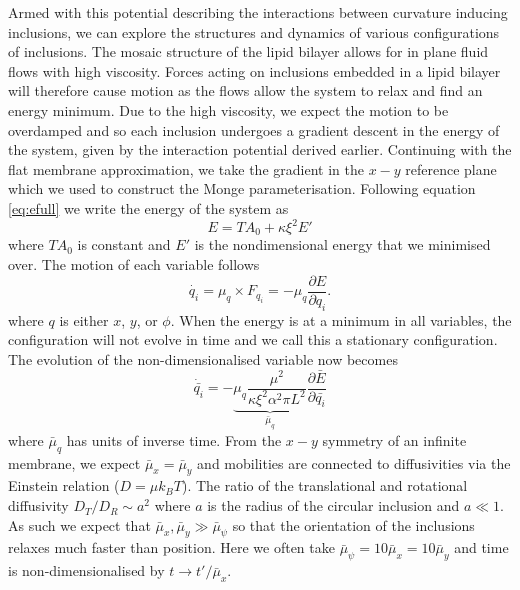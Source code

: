 Armed with this potential describing the interactions between curvature inducing inclusions, we can explore the structures and dynamics of various configurations of inclusions. The mosaic structure of the lipid bilayer allows for in plane fluid flows with high viscosity. Forces acting on inclusions embedded in a lipid bilayer will therefore cause motion as the flows allow the system to relax and find an energy minimum. Due to the high viscosity, we expect the motion to be overdamped and so each inclusion undergoes a gradient descent in the energy of the system, given by the interaction potential derived earlier. Continuing with the flat membrane approximation, we take the gradient in the $x-y$ reference plane which we used to construct the Monge parameterisation. Following equation \ref{eq:efull} we write the energy of the system as
\begin{equation}
        E= TA_0 + \kappa\xi^2 E'
\end{equation}
where $TA_0$ is constant and $E'$ is the nondimensional energy that we minimised over. The motion of each variable follows
\begin{equation}
    \dot{q_i} = \mu_q \times F_{q_i} =-\mu_q \frac{\partial E}{\partial q_i}.
\end{equation}
where $q$ is either $x$, $y$, or $\phi$. When the energy is at a minimum in all variables, the configuration will not evolve in time and we call this a stationary configuration. The evolution of the non-dimensionalised variable now becomes
\begin{equation}
    \dot{\bar{q_i}} = -\underbrace{\mu_q \frac{\mu^2}{\kappa \xi^2\alpha^2\pi L^2}}_{\bar{\mu}_q}\frac{\partial \bar{E}}{\partial \bar{q_i}}
    \label{eq:overdamp}
\end{equation}
where $\bar{\mu}_q$ has units of inverse time.  From the $x-y$ symmetry of an infinite membrane, we expect $\bar{\mu}_x = \bar{\mu}_y$ and mobilities are connected to diffusivities via the Einstein relation ($D=\mu k_B T$). The ratio of the translational and rotational diffusivity $D_T/D_R\sim a^2$ where $a$ is the radius of the circular inclusion and $a \ll 1$. As such we expect that $\bar{\mu}_x, \bar{\mu}_y \gg \bar{\mu}_{\psi}$ so that the orientation of the inclusions relaxes much faster than position. Here we often take $\bar{\mu}_{\psi} = 10 \bar{\mu}_x = 10\bar{\mu}_y$ and time is non-dimensionalised by $t \rightarrow  t'/\bar{\mu}_x$. 

